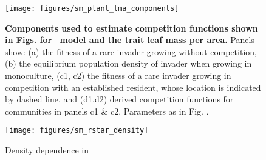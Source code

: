 \documentclass[10pt,twoside]{article}
\begin{document}
\begin{figure}[h]
 \centering
 \texttt{[image: figures/sm\_plant\_lma\_components]}
 \caption{\textbf{Components used to estimate competition functions shown in Figs.
 {\figPlantLma} for \plant\ model and the trait leaf mass per area.}
  Panels show: (a) the fitness of a rare invader growing without competition,
  (b) the equilibrium population density of invader when growing in monoculture,
  (c1, c2) the fitness of a rare invader growing in competition with an established
  resident, whose location is indicated by dashed line, and (d1,d2) derived competition
  functions for communities in panels  c1 \& c2. Parameters as in Fig.
  {\figPlantLma}.
  \label{fig:sm_plant_lma_components}}
\end{figure}

\begin{figure}[h]
  \centering
  \texttt{[image: figures/sm\_rstar\_density]}
  \caption{Density dependence in \Rstar}
  \label{fig:rstar_density_dependence}
\end{figure}

% 
% 
\end{document}
